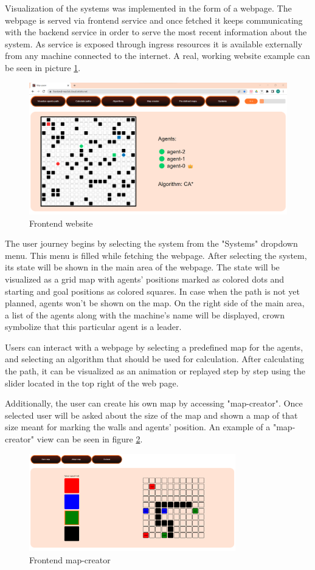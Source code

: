 Visualization of the systems was implemented in the form of a webpage. The webpage is served via frontend service and once fetched it keeps communicating with the backend service in order to serve the most recent information about the system. As service is exposed through ingress resources it is available externally from any machine connected to the internet. A real, working website example can be seen in picture \ref{fig:frontend}.

\begin{figure}[H]
    \centering
    \includegraphics[width=\textwidth]{pictures/frontend.png}
    \caption{ Frontend website } 
    \label{fig:frontend}
\end{figure}

The user journey begins by selecting the system from the "Systems" dropdown menu. This menu is filled  while fetching the webpage. After selecting the system, its state will be shown in the main area of the webpage. The state will be visualized as a grid map with agents' positions marked as colored dots and starting and goal positions as colored squares. In case when the path is not yet planned, agents won't be shown on the map. On the right side of the main area, a list of the agents along with the machine's name will be displayed, crown symbolize that this particular agent is a leader.

Users can interact with a webpage by selecting a predefined map for the agents, and selecting an algorithm that should be used for calculation. After calculating the path, it can be visualized as an animation or replayed step by step using the slider located in the top right of the web page.

Additionally, the user can create his own map by accessing "map-creator". Once selected user will be asked about the size of the map and shown a map of that size meant for marking the walls and agents' position. An example of a "map-creator" view can be seen in figure \ref{fig:map-creator}.

\begin{figure}[H]
    \centering
    \includegraphics[width=0.8\textwidth]{pictures/map-creator.png}
    \caption{ Frontend map-creator } 
    \label{fig:map-creator}
\end{figure}